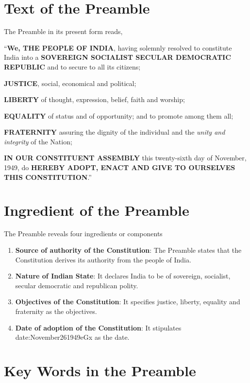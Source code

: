 \section{Text of the Preamble}

The Preamble in its present form reads,

\textquotedblleft \textbf{We, THE PEOPLE OF INDIA}, having solemnly resolved to constitute\\India into a \textbf{SOVEREIGN SOCIALIST SECULAR DEMOCRATIC REPUBLIC} and to secure to all its citizens;
\begin{list}{}{}
  \item \textbf{JUSTICE}, social, economical and political;
  \item \textbf{LIBERTY} of thought, expression, belief, faith and worship;
  \item \textbf{EQUALITY} of status and of opportunity; and to promote among them all;
  \item \textbf{FRATERNITY} assuring the dignity of the individual and the \textit{unity and integrity} of the Nation;
\end{list}
\textbf{IN OUR CONSTITUENT ASSEMBLY} this twenty-sixth day of November, 1949, do \textbf{HEREBY ADOPT, ENACT AND GIVE TO OURSELVES THIS CONSTITUTION}.\textquotedblright

\section{Ingredient of the Preamble}

The Preamble reveals four ingredients or components

\begin{enumerate}
  \item \textbf{Source of authority of the Constitution}: The Preamble states that the Constitution derives its authority from the people of India.
  \item \textbf{Nature of Indian State}: It declares India to be of sovereign, socialist, secular democratic and republican polity.
  \item \textbf{Objectives of the Constitution}: It specifies justice, liberty, equality and fraternity as the objectives.
  \item \textbf{Date of adoption of the Constitution}: It stipulates \gls{date:November261949eGx} as the date.
\end{enumerate}


\section{Key Words in the Preamble}

